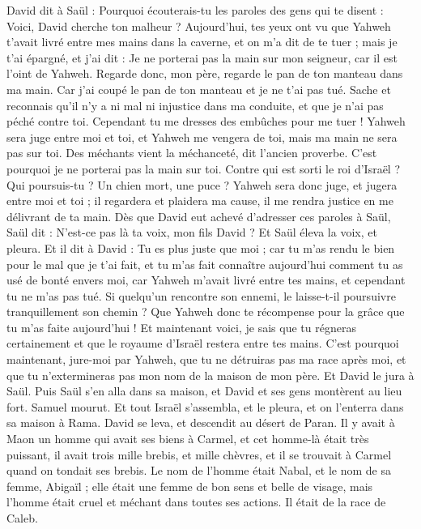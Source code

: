 \begin{multicols}{2}
David dit à Saül : Pourquoi écouterais-tu les paroles des gens qui te disent : Voici, David cherche ton malheur ?
Aujourd'hui, tes yeux ont vu que Yahweh t'avait livré entre mes mains dans la caverne, et on m'a dit de te tuer ; mais je t'ai épargné, et j'ai dit : Je ne porterai pas la main sur mon seigneur, car il est l'oint de Yahweh.
Regarde donc, mon père, regarde le pan de ton manteau dans ma main. Car j'ai coupé le pan de ton manteau et je ne t'ai pas tué. Sache et reconnais qu'il n'y a ni mal ni injustice dans ma conduite, et que je n'ai pas péché contre toi. Cependant tu me dresses des embûches pour me tuer !
Yahweh sera juge entre moi et toi, et Yahweh me vengera de toi, mais ma main ne sera pas sur toi.
Des méchants vient la méchanceté, dit l'ancien proverbe. C'est pourquoi je ne porterai pas la main sur toi.
Contre qui est sorti le roi d'Israël ? Qui poursuis-tu ? Un chien mort, une puce ?
Yahweh sera donc juge, et jugera entre moi et toi ; il regardera et plaidera ma cause, il me rendra justice en me délivrant de ta main.
Dès que David eut achevé d'adresser ces paroles à Saül, Saül dit : N'est-ce pas là ta voix, mon fils David ? Et Saül éleva la voix, et pleura.
Et il dit à David : Tu es plus juste que moi ; car tu m'as rendu le bien pour le mal que je t'ai fait,
et tu m'as fait connaître aujourd'hui comment tu as usé de bonté envers moi, car Yahweh m'avait livré entre tes mains, et cependant tu ne m'as pas tué.
Si quelqu'un rencontre son ennemi, le laisse-t-il poursuivre tranquillement son chemin ? Que Yahweh donc te récompense pour la grâce que tu m'as faite aujourd'hui !
Et maintenant voici, je sais que tu régneras certainement et que le royaume d'Israël restera entre tes mains.
C'est pourquoi maintenant, jure-moi par Yahweh, que tu ne détruiras pas ma race après moi, et que tu n'extermineras pas mon nom de la maison de mon père.
Et David le jura à Saül. Puis Saül s'en alla dans sa maison, et David et ses gens montèrent au lieu fort.
\VerseOne{}Samuel mourut. Et tout Israël s'assembla, et le pleura, et on l'enterra dans sa maison à Rama. David se leva, et descendit au désert de Paran.
Il y avait à Maon un homme qui avait ses biens à Carmel, et cet homme-là était très puissant, il avait trois mille brebis, et mille chèvres, et il se trouvait à Carmel quand on tondait ses brebis.
Le nom de l'homme était Nabal, et le nom de sa femme, Abigaïl ; elle était une femme de bon sens et belle de visage, mais l'homme était cruel et méchant dans toutes ses actions. Il était de la race de Caleb.

\end{multicols}
